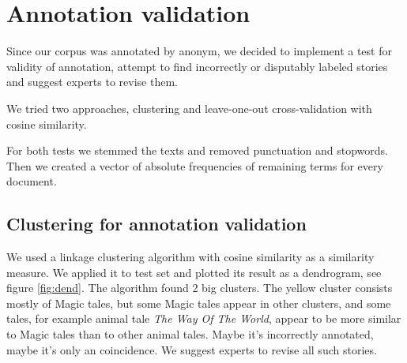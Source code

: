 \documentclass[a4paper]{article}
\begin{document}
\section{Annotation validation}

Since our corpus was annotated by anonym, we decided to    implement a test for validity of annotation, attempt to find incorrectly or disputably labeled stories and suggest experts to revise them.

We tried two approaches, clustering and leave-one-out cross-validation with cosine similarity.

For both tests we stemmed the texts and removed punctuation and stopwords. Then we created a vector of absolute frequencies of remaining terms for every document. 

\subsection{Clustering for annotation validation}

We used a linkage clustering algorithm with cosine similarity as a similarity measure. We applied it to test set and plotted its result as a dendrogram, see figure \ref{fig:dend}. The algorithm found 2 big clusters. The yellow cluster consists mostly of Magic tales, but some Magic tales appear in other clusters, and some tales, for example animal tale \textit{The Way Of The World}, appear to be more similar to Magic tales than to other animal tales. Maybe it's incorrectly annotated, maybe it's only an coincidence. We suggest experts to revise all such stories.
\end{document}
